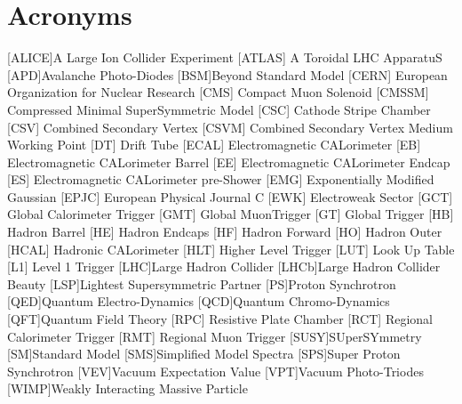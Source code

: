 
%



\newpage
\section*{Acronyms}

\begin{acronym}[AAAAAAA]
[ALICE]{A Large Ion Collider Experiment}
 [ATLAS] {A Toroidal LHC ApparatuS}
[APD]{Avalanche Photo-Diodes}
[BSM]{Beyond Standard Model}
 [CERN] {European Organization for Nuclear Research}
 [CMS] {Compact Muon Solenoid}
 [CMSSM] {Compressed Minimal SuperSymmetric Model}
 [CSC] {Cathode Stripe Chamber}
 [CSV] {Combined Secondary Vertex}
 [CSVM] {Combined Secondary Vertex Medium Working Point}
 [DT] {Drift Tube}
 [ECAL] {Electromagnetic CALorimeter}
 [EB] {Electromagnetic CALorimeter Barrel}
 [EE] {Electromagnetic CALorimeter Endcap}
 [ES] {Electromagnetic CALorimeter pre-Shower}
 [EMG] {Exponentially Modified Gaussian}
 [EPJC] {European Physical Journal C}
 [EWK] {Electroweak Sector}
 [GCT] {Global Calorimeter Trigger}
 [GMT] {Global MuonTrigger}
 [GT] {Global Trigger}
 [HB] {Hadron Barrel}
 [HE] {Hadron Endcaps}
 [HF] {Hadron Forward}
 [HO] {Hadron Outer}
 [HCAL] {Hadronic CALorimeter}
[HLT] {Higher Level Trigger}
 [LUT] {Look Up Table}
 [L1] {Level 1 Trigger}
[LHC]{Large Hadron Collider}
[LHCb]{Large Hadron Collider Beauty}
[LSP]{Lightest Supersymmetric Partner}
[PS]{Proton Synchrotron}
[QED]{Quantum Electro-Dynamics}
[QCD]{Quantum Chromo-Dynamics}
[QFT]{Quantum Field Theory}
 [RPC] {Resistive Plate Chamber}
 [RCT] {Regional Calorimeter Trigger}
 [RMT] {Regional Muon Trigger}
[SUSY]{SUperSYmmetry}
[SM]{Standard Model}
[SMS]{Simplified Model Spectra}
[SPS]{Super Proton Synchrotron}
[VEV]{Vacuum Expectation Value}
[VPT]{Vacuum Photo-Triodes}
[WIMP]{Weakly Interacting Massive Particle}

\end{acronym}


